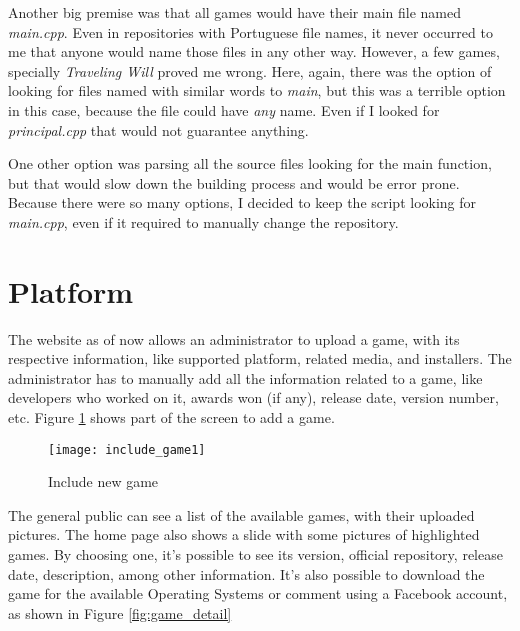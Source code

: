 Another big premise was that all games would have their main file named \textit{main.cpp}. Even in repositories with Portuguese file names, it never occurred to me that anyone would name those files in any other way. However, a few games, specially \textit{Traveling Will} proved me wrong. Here, again, there was the option of looking for files named with similar words to \textit{main}, but this was a terrible option in this case, because the file could have \textit{any} name. Even if I looked for \textit{principal.cpp} that would not guarantee anything.

One other option was parsing all the source files looking for the main function, but that would slow down the building process and would be error prone. Because there were so many options, I decided to keep the script looking for \textit{main.cpp}, even if it required to manually change the repository.


\section{Platform}
\label{sec:platform}

The website as of now allows an administrator to upload a game, with its respective information, like supported platform, related media, and installers.
The administrator has to manually add all the information related to a game, like developers who worked on it, awards won (if any), release date, version number, etc. Figure \ref{fig:include_game1} shows part of the screen to add a game.



\begin{figure}[h!]
\centering
\texttt{[image: include\_game1]}
\caption{Include new game}
\label{fig:include_game1}
\end{figure}

The general public can see a list of the available games, with their uploaded pictures. The home page also shows a slide with some pictures of highlighted games. By choosing one, it's possible to see its version, official repository, release date, description, among other information. It's also possible to download the game for the available Operating Systems or comment using a Facebook account, as shown in Figure \ref{fig:game_detail}

